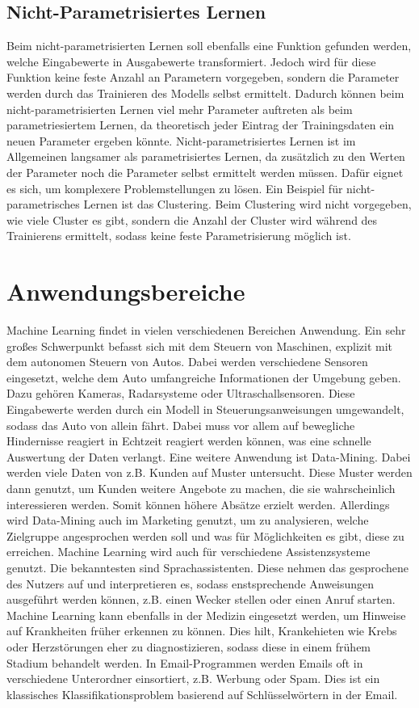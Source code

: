 \subsection{Nicht-Parametrisiertes Lernen}
\label{nichtParametrisiertesLernen}
Beim nicht-parametrisierten Lernen soll ebenfalls eine Funktion gefunden werden, welche Eingabewerte in Ausgabewerte transformiert. Jedoch wird für diese Funktion keine feste Anzahl an Parametern vorgegeben, sondern die Parameter werden durch das Trainieren des Modells selbst ermittelt. Dadurch können beim nicht-parametrisierten Lernen viel mehr Parameter auftreten als beim parametriesiertem Lernen, da theoretisch jeder Eintrag der Trainingsdaten ein neuen Parameter ergeben könnte. Nicht-parametrisiertes Lernen ist im Allgemeinen langsamer als parametrisiertes Lernen, da zusätzlich zu den Werten der Parameter noch die Parameter selbst ermittelt werden müssen. Dafür eignet es sich, um komplexere Problemstellungen zu lösen.
Ein Beispiel für nicht-parametrisches Lernen ist das Clustering. Beim Clustering wird nicht vorgegeben, wie viele Cluster es gibt, sondern die Anzahl der Cluster wird während des Trainierens ermittelt, sodass keine feste Parametrisierung möglich ist.

\section{Anwendungsbereiche}
\label{sec:anwendungsbereiche}
Machine Learning findet in vielen verschiedenen Bereichen Anwendung. Ein sehr großes Schwerpunkt befasst sich mit dem Steuern von Maschinen, explizit mit dem autonomen Steuern von Autos. Dabei werden verschiedene Sensoren eingesetzt, welche dem Auto umfangreiche Informationen der Umgebung geben. Dazu gehören Kameras, Radarsysteme oder Ultraschallsensoren. Diese Eingabewerte werden durch ein Modell in Steuerungsanweisungen umgewandelt, sodass das Auto von allein fährt. Dabei muss vor allem auf bewegliche Hindernisse reagiert in Echtzeit reagiert werden können, was eine schnelle Auswertung der Daten verlangt.
Eine weitere Anwendung ist Data-Mining. Dabei werden viele Daten von z.B. Kunden auf Muster untersucht. Diese Muster werden dann genutzt, um Kunden weitere Angebote zu machen, die sie wahrscheinlich interessieren werden. Somit können höhere Absätze erzielt werden. Allerdings wird Data-Mining auch im Marketing genutzt, um zu analysieren, welche Zielgruppe angesprochen werden soll und was für Möglichkeiten es gibt, diese zu erreichen.
Machine Learning wird auch für verschiedene Assistenzsysteme genutzt. Die bekanntesten sind Sprachassistenten. Diese nehmen das gesprochene des Nutzers auf und interpretieren es, sodass enstsprechende Anweisungen ausgeführt werden können, z.B. einen Wecker stellen oder einen Anruf starten.
Machine Learning kann ebenfalls in der Medizin eingesetzt werden, um Hinweise auf Krankheiten früher erkennen zu können. Dies hilt, Krankehieten wie Krebs oder Herzstörungen eher zu diagnostizieren, sodass diese in einem frühem Stadium behandelt werden.
In Email-Programmen werden Emails oft in verschiedene Unterordner einsortiert, z.B. Werbung oder Spam. Dies ist ein klassisches Klassifikationsproblem basierend auf Schlüsselwörtern in der Email.
